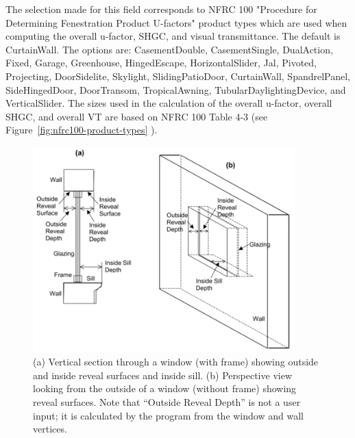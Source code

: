 The selection made for this field corresponds to NFRC 100 "Procedure for Determining Fenestration Product U-factors" product types which are used when computing the overall u-factor, SHGC, and visual transmittance. The default is CurtainWall. The options are: CasementDouble, CasementSingle, DualAction, Fixed, Garage, Greenhouse, HingedEscape, HorizontalSlider, Jal, Pivoted, Projecting, DoorSidelite, Skylight, SlidingPatioDoor, CurtainWall, SpandrelPanel, SideHingedDoor, DoorTransom, TropicalAwning, TubularDaylightingDevice, and VerticalSlider. The sizes used in the calculation of the overall u-factor, overall SHGC, and overall VT are based on NFRC 100 Table 4-3 (see Figure~\ref{fig:nfrc100-product-types} ). 


\begin{figure}[hbtp] %
\centering
\includegraphics[width=0.9\textwidth, height=0.9\textheight, keepaspectratio=true]{media/image064.png}
\caption{(a) Vertical section through a window (with frame) showing outside and inside reveal surfaces and inside sill. (b) Perspective view looking from the outside of a window (without frame) showing reveal surfaces. Note that “Outside Reveal Depth” is not a user input; it is calculated by the program from the window and wall vertices. \protect \label{fig:a-vertical-section-through-a-window-with}}
\end{figure}

